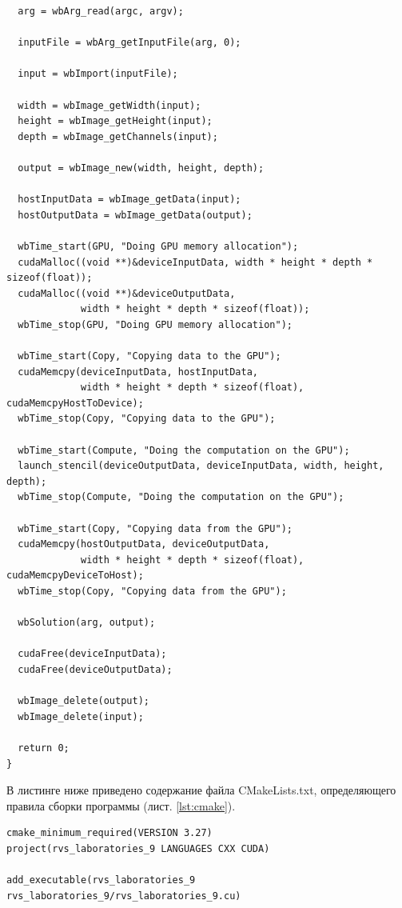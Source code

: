 \documentclass[14pt]{extarticle}
\newenvironment{code}{\captionsetup{type=listing, belowskip=-14pt plus 3pt minus 0pt}}{}
\begin{document}
\begin{code}
\begin{verbatim}
  arg = wbArg_read(argc, argv);

  inputFile = wbArg_getInputFile(arg, 0);

  input = wbImport(inputFile);

  width = wbImage_getWidth(input);
  height = wbImage_getHeight(input);
  depth = wbImage_getChannels(input);

  output = wbImage_new(width, height, depth);

  hostInputData = wbImage_getData(input);
  hostOutputData = wbImage_getData(output);

  wbTime_start(GPU, "Doing GPU memory allocation");
  cudaMalloc((void **)&deviceInputData, width * height * depth * sizeof(float));
  cudaMalloc((void **)&deviceOutputData,
             width * height * depth * sizeof(float));
  wbTime_stop(GPU, "Doing GPU memory allocation");

  wbTime_start(Copy, "Copying data to the GPU");
  cudaMemcpy(deviceInputData, hostInputData,
             width * height * depth * sizeof(float), cudaMemcpyHostToDevice);
  wbTime_stop(Copy, "Copying data to the GPU");

  wbTime_start(Compute, "Doing the computation on the GPU");
  launch_stencil(deviceOutputData, deviceInputData, width, height, depth);
  wbTime_stop(Compute, "Doing the computation on the GPU");

  wbTime_start(Copy, "Copying data from the GPU");
  cudaMemcpy(hostOutputData, deviceOutputData,
             width * height * depth * sizeof(float), cudaMemcpyDeviceToHost);
  wbTime_stop(Copy, "Copying data from the GPU");

  wbSolution(arg, output);

  cudaFree(deviceInputData);
  cudaFree(deviceOutputData);

  wbImage_delete(output);
  wbImage_delete(input);

  return 0;
}
\end{verbatim}
\end{code}

\pagebreak

В листинге ниже приведено содержание файла CMakeLists.txt, определяющего правила сборки программы (лист. \ref{lst:cmake}).

\begin{code}    
\caption{Содержание CMakeLists.txt\label{lst:cmake}}
\begin{verbatim}
cmake_minimum_required(VERSION 3.27)
project(rvs_laboratories_9 LANGUAGES CXX CUDA)

add_executable(rvs_laboratories_9 rvs_laboratories_9/rvs_laboratories_9.cu)
\end{verbatim}
\end{code}
\end{document}
